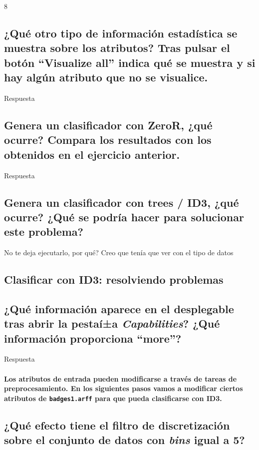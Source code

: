 \documentclass[12pt]{article}
\begin{document}
8

\subsection{\small ¿Qué otro tipo de información estadí­stica se muestra sobre los
atributos? Tras pulsar el botón ``Visualize all'' indica qué se muestra y si
hay algún atributo que no se visualice.}

Respuesta

\subsection{\small Genera un clasificador con ZeroR, ¿qué ocurre? Compara los resultados con
los obtenidos en el ejercicio anterior.}

Respuesta

\subsection{\small Genera un clasificador con trees / ID3, ¿qué ocurre? ¿Qué se podrí­a hacer
para solucionar este problema?}

No te deja ejecutarlo, por qué? Creo que tení­a que ver con el tipo de datos

\newpage

\begin{center}
\section{Clasificar con ID3: resolviendo problemas}
\end{center}

\subsection{\small ¿Qué información aparece en el desplegable tras abrir la pestaí±a
\emph{Capabilities}? ¿Qué información proporciona ``more''?}

Respuesta

\paragraph{\small Los atributos de entrada pueden modificarse a través de tareas de
preprocesamiento. En los siguientes pasos vamos a modificar ciertos atributos
de \texttt{badges1.arff} para que pueda clasificarse con ID3.}

\subsection{\small ¿Qué efecto tiene el filtro de discretización sobre el conjunto de
datos con \emph{bins} igual a 5?}
\end{document}
